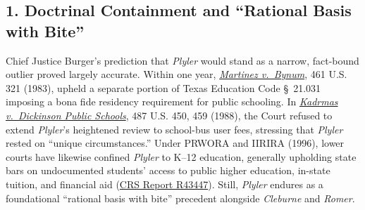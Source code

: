 \documentclass[12pt]{article}
\begin{document}
\subsection*{1. Doctrinal Containment and ``Rational Basis with Bite''}
Chief Justice Burger's prediction that \textit{Plyler} would stand as a narrow, fact-bound outlier proved largely accurate. Within one year, \href{https://supreme.justia.com/cases/federal/us/461/321/}{\textit{Martinez v.\ Bynum}}, 461 U.S. 321 (1983), upheld a separate portion of Texas Education Code \S~21.031 imposing a bona fide residency requirement for public schooling. In \href{https://supreme.justia.com/cases/federal/us/487/450/}{\textit{Kadrmas v.\ Dickinson Public Schools}}, 487 U.S. 450, 459 (1988), the Court refused to extend \textit{Plyler}'s heightened review to school-bus user fees, stressing that \textit{Plyler} rested on ``unique circumstances.'' Under PRWORA and IIRIRA (1996), lower courts have likewise confined \textit{Plyler} to K--12 education, generally upholding state bars on undocumented students' access to public higher education, in-state tuition, and financial aid (\href{https://www.everycrsreport.com/reports/R43447.html}{CRS Report R43447}). Still, \textit{Plyler} endures as a foundational ``rational basis with bite'' precedent alongside \textit{Cleburne} and \textit{Romer}.
\end{document}
